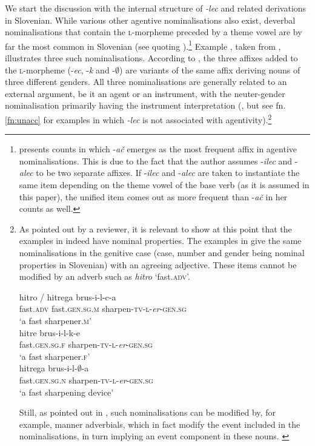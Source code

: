 \documentclass[output=paper,colorlinks,citecolor=brown]{langscibook}
\begin{document}
We start the discussion with the internal structure of \textit{-lec} and related derivations in Slovenian. While various other agentive nominalisations also exist, deverbal nominalisations that contain the \textsc{l}-morpheme preceded by a theme vowel are by far the most common in Slovenian (see \citealt{marvin2016, marvin2015} quoting \citealt{stramljic1999}).\footnote{\citet[]{stramljivc1995specializiranost} presents counts in which -\textit{ač} emerges as the most frequent affix in agentive nominalisations. This is due to the fact that the author assumes -\textit{ilec} and -\textit{alec} to be two separate affixes. If -\textit{ilec} and -\textit{alec} are taken to instantiate the same item depending on the theme vowel of the base verb (as it is assumed in this paper), the unified item comes out as more frequent than -\textit{ač} in her counts as well.} Example , taken from \citet[ 98, (22)]{marvin2002}, illustrates three such nominalisations. According to \citeauthor{marvin2002}, the three affixes added to the \textsc{l}-morpheme (-\textit{ec}, -\textit{k} and -$\emptyset$) are variants of the same affix deriving nouns of three different genders. All three nominalisations are generally related to an external argument, be it an agent or an instrument, with the neuter-gender nominalisation primarily having the instrument interpretation (\cite[ 99, fn. 18]{marvin2002}, but see fn. \ref{fn:unacc} for examples in which \textit{-lec} is not associated with agentivity).\footnote{As pointed out by a reviewer, it is relevant to show at this point that the examples in  indeed have nominal properties. The examples in  give the same nominalisations in the genitive case (case, number and gender being nominal properties in Slovenian) with an agreeing adjective. These items cannot be modified by an adverb such as \textit{hitro} `fast.\textsc{adv}'.

\ea \label{ex:adjbrus} \ea 
\glll *hitro / hitrega brus-i-l-c-a \\ 
{ }fast.\textsc{adv} {} fast.\textsc{gen.sg.m} sharpen-\textsc{tv}-\textsc{l}-\textit{er}-\textsc{gen.sg} \\
`a{ }fast sharpener.\textsc{m}'\\

\ex \glll hitre brus-i-l-k-e \\
 fast.\textsc{gen.sg.f} sharpen-\textsc{tv}-\textsc{l}-\textit{er}-\textsc{gen.sg} \\
 `a{ }fast sharpener.\textsc{f}'\\

\ex \glll hitrega {brus-i-l-$\emptyset$-a  } \\
fast.\textsc{gen.sg.n} sharpen-\textsc{tv}-\textsc{l}-\textit{er}-\textsc{gen.sg}\\ 
`a{ }fast sharpening{ }device' \\

\z \z 

\noindent Still, as pointed out in \citet[101]{marvin2002},  such nominalisations can be modified by, for example, manner adverbials, which in fact modify the event included in the nominalisations, in turn implying an event component in these nouns. \label{fn:adverbial}} 
\end{document}
